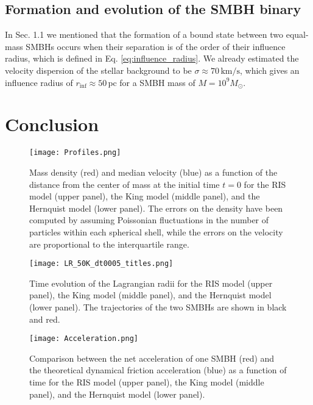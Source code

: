 \documentclass[fleqn,usenatbib]{mnras}
\begin{document}
\subsection{Formation and evolution of the SMBH binary}\label{sec:analysis_binary}
In Sec. 1.1 we mentioned that the formation of a bound state between two equal-mass SMBHs occurs when their separation is of the order of their influence radius, which is defined in Eq. \ref{eq:influence_radius}.
We already estimated the velocity dispersion of the stellar background to be $\sigma \approx 70 \,\text{km/s}$, which gives an influence radius of $r_\text{inf} \approx 50 \,\text{pc}$ for a SMBH mass of $M=10^9 M_\odot$.



\section{Conclusion}\label{sec:conclusion}


\begin{figure}\centering
	\texttt{[image: Profiles.png]}
    \caption{Mass density (red) and median velocity (blue) as a function of the distance from the center of mass at the initial time $t=0$ for the RIS model (upper panel), the King model (middle panel), and the Hernquist model (lower panel). The errors on the density have been computed by assuming Poissonian fluctuations in the number of particles within each spherical shell, while the errors on the velocity are proportional to the interquartile range.}
    \label{fig:profiles}
\end{figure}

\begin{figure}\centering
	\texttt{[image: LR\_50K\_dt0005\_titles.png]}
    \caption{Time evolution of the Lagrangian radii for the RIS model (upper panel), the King model (middle panel), and the Hernquist model (lower panel). The trajectories of the two SMBHs are shown in black and red.}
    \label{fig:Lagrangian_radii}
\end{figure}

\begin{figure}\centering
	\texttt{[image: Acceleration.png]}
    \caption{Comparison between the net acceleration of one SMBH (red) and the theoretical dynamical friction acceleration (blue) as a function of time for the RIS model (upper panel), the King model (middle panel), and the Hernquist model (lower panel).}
    \label{fig:Acceleration}
\end{figure}
\end{document}
